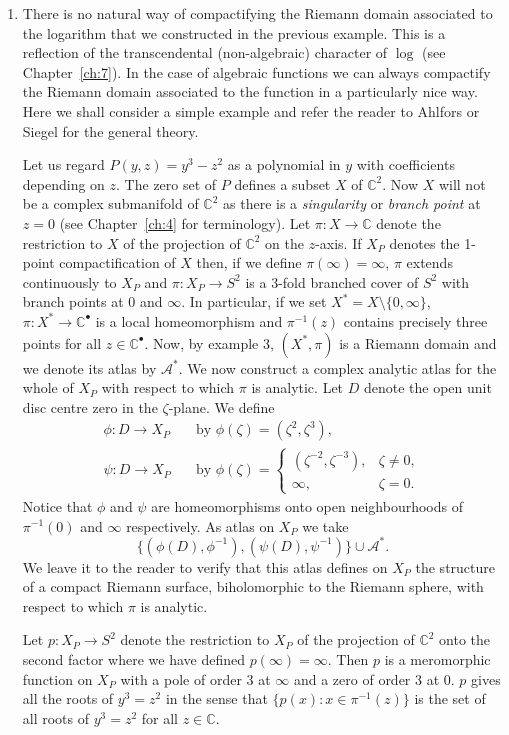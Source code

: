 \begin{enumerate}
\item There is no natural way of compactifying the Riemann domain associated to the logarithm that we constructed in the previous example. This is a reflection of the transcendental (non-algebraic) character of $\log$ (see Chapter~\ref{ch:7}). In the case of algebraic functions we can always compactify the Riemann domain associated to the function in a particularly nice way. Here we shall consider a simple example and refer the reader to Ahlfors \cite{bib:I:ahlfors-l-v:1} or Siegel \cite{bib:I:siegel-c-l:1} for the general theory.

Let us regard $P(y,z)=y^3-z^2$ as a polynomial in $y$ with coefficients depending on $z$. The zero set of $P$ defines a subset $X$ of $\mathbb C^2$. Now $X$ will not be a complex submanifold of $\mathbb C^2$ as there is a \emph{singularity} or \emph{branch point} at $z=0$ (see Chapter~\ref{ch:4} for terminology). Let $\pi:X\to\mathbb C$ denote the restriction to $X$ of the projection of $\mathbb C^2$ on the $z$-axis. If $X_P$ denotes the 1-point compactification of $X$ then, if we define $\pi(\infty)=\infty$, $\pi$ extends continuously to $X_P$ and $\pi:X_P\to S^2$ is a 3-fold branched cover of $S^2$ with branch points at 0 and $\infty$. In particular, if we set $X^*=X\setminus\{0,\infty\}$, $\pi:X^*\to\mathbb C^\bullet$ is a local homeomorphism and $\pi^{-1}(z)$ contains precisely three points for all $z\in\mathbb C^\bullet$. Now, by example 3, $(X^*,\pi)$ is a Riemann domain and we denote its atlas by $\mathcal A^*$. We now construct a complex analytic atlas for the whole of $X_P$ with respect to which $\pi$ is analytic. Let $D$ denote the open unit disc centre zero in the $\zeta$-plane. We define
\begin{align*}
\phi:D\to X_P&\quad\text{by }\phi(\zeta)=(\zeta^2,\zeta^3),\\
\psi:D\to X_P&\quad\text{by }\phi(\zeta)=\begin{cases}(\zeta^{-2},\zeta^{-3}),&\zeta\ne0,\\\infty,&\zeta=0.\end{cases}
\end{align*}
Notice that $\phi$ and $\psi$ are homeomorphisms onto open neighbourhoods of $\pi^{-1}(0)$ and $\infty$ respectively. As atlas on $X_P$ we take
\[ \{(\phi(D),\phi^{-1}),(\psi(D),\psi^{-1})\}\cup\mathcal A^*. \]
We leave it to the reader to verify that this atlas defines on $X_P$ the structure of a compact Riemann surface, biholomorphic to the Riemann sphere, with respect to which $\pi$ is analytic.


Let $p:X_P\to S^2$ denote the restriction to $X_P$ of the projection of $\mathbb C^2$ onto the second factor where we have defined $p(\infty)=\infty$. Then $p$ is a meromorphic function on $X_P$ with a pole of order 3 at $\infty$ and a zero of order 3 at 0. $p$ gives all the roots of $y^3=z^2$ in the sense that $\{p(x):x\in\pi^{-1}(z)\}$ is the set of all roots of $y^3=z^2$ for all $z\in\mathbb C$.

\end{enumerate}

